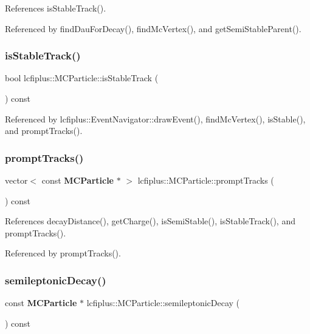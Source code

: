 References is\+Stable\+Track().



Referenced by find\+Dau\+For\+Decay(), find\+Mc\+Vertex(), and get\+Semi\+Stable\+Parent().

\mbox{\label{classlcfiplus_1_1MCParticle_a531131c80a80cef7405688e4e8fa7a89}} 
\subsubsection{is\+Stable\+Track()}
{\footnotesize\ttfamily bool lcfiplus\+::\+M\+C\+Particle\+::is\+Stable\+Track (\begin{DoxyParamCaption}{ }\end{DoxyParamCaption}) const}



Referenced by lcfiplus\+::\+Event\+Navigator\+::draw\+Event(), find\+Mc\+Vertex(), is\+Stable(), and prompt\+Tracks().

\mbox{\label{classlcfiplus_1_1MCParticle_a133f8e3655925fed8e29159c58561b6c}} 
\subsubsection{prompt\+Tracks()}
{\footnotesize\ttfamily vector$<$ const \textbf{ M\+C\+Particle} $\ast$ $>$ lcfiplus\+::\+M\+C\+Particle\+::prompt\+Tracks (\begin{DoxyParamCaption}{ }\end{DoxyParamCaption}) const}



References decay\+Distance(), get\+Charge(), is\+Semi\+Stable(), is\+Stable\+Track(), and prompt\+Tracks().



Referenced by prompt\+Tracks().

\mbox{\label{classlcfiplus_1_1MCParticle_a1169563b159c32a86780c2db6975b7c7}} 
\subsubsection{semileptonic\+Decay()}
{\footnotesize\ttfamily const \textbf{ M\+C\+Particle} $\ast$ lcfiplus\+::\+M\+C\+Particle\+::semileptonic\+Decay (\begin{DoxyParamCaption}{ }\end{DoxyParamCaption}) const}



